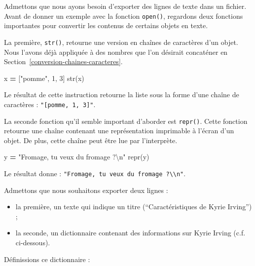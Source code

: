 \documentclass[12pt,]{book}
\newenvironment{Shaded}{\begin{snugshade}}{\end{snugshade}}
\newcommand{\DecValTok}[1]{\textcolor[rgb]{0.00,0.00,0.81}{#1}}
\newcommand{\CharTok}[1]{\textcolor[rgb]{0.31,0.60,0.02}{#1}}
\newcommand{\StringTok}[1]{\textcolor[rgb]{0.31,0.60,0.02}{#1}}
\newcommand{\OperatorTok}[1]{\textcolor[rgb]{0.81,0.36,0.00}{\textbf{#1}}}
\newcommand{\BuiltInTok}[1]{#1}
\newcommand{\NormalTok}[1]{#1}
\providecommand{\tightlist}{%
  \setlength{\itemsep}{0pt}\setlength{\parskip}{0pt}}
\numberwithin{equation}{section}
\numberwithin{countremarque}{section}
\begin{document}
Admettons que nous ayons besoin d'exporter des lignes de texte dans un
fichier. Avant de donner un exemple avec la fonction \texttt{open()},
regardons deux fonctions importantes pour convertir les contenus de
certains objets en texte.

La première, \texttt{str()}, retourne une version en chaînes de
caractères d'un objet. Nous l'avons déjà appliquée à des nombres que
l'on désirait concaténer en Section~\ref{conversion-chaines-caracteres}.

\begin{Shaded}
\begin{Highlighting}[]
\NormalTok{x }\OperatorTok{=}\NormalTok{ [}\StringTok{"pomme"}\NormalTok{, }\DecValTok{1}\NormalTok{, }\DecValTok{3}\NormalTok{]}
\BuiltInTok{str}\NormalTok{(x)}
\end{Highlighting}
\end{Shaded}

Le résultat de cette instruction retourne la liste sous la forme d'une
chaîne de caractères :
\texttt{"{[}\textquotesingle{}pomme\textquotesingle{},\ 1,\ 3{]}"}.

La seconde fonction qu'il semble important d'aborder est
\texttt{repr()}. Cette fonction retourne une chaîne contenant une
représentation imprimable à l'écran d'un objet. De plus, cette chaîne
peut être lue par l'interprète.

\begin{Shaded}
\begin{Highlighting}[]
\NormalTok{y }\OperatorTok{=} \StringTok{"Fromage, tu veux du fromage ?}\CharTok{\textbackslash{}n}\StringTok{"}
\BuiltInTok{repr}\NormalTok{(y)}
\end{Highlighting}
\end{Shaded}

Le résultat donne :
\texttt{"\textquotesingle{}Fromage,\ tu\ veux\ du\ fromage\ ?\textbackslash{}\textbackslash{}n\textquotesingle{}"}.

Admettons que nous souhaitons exporter deux lignes :

\begin{itemize}
\tightlist
\item
  la première, un texte qui indique un titre (``Caractéristiques de
  Kyrie Irving'') ;
\item
  la seconde, un dictionnaire contenant des informations sur Kyrie
  Irving (c.f. ci-dessous).
\end{itemize}

Définissions ce dictionnaire :
\end{document}
